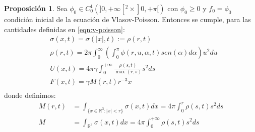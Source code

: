 \documentclass[a4paper,10pt]{scrartcl}
\theoremstyle{definition}
\newtheorem{fact}{Proposición}
\numberwithin{equation}{section}
\begin{document}
\begin{fact}
Sea $\phi_0 \in C_0^1(]0,+\infty[^2 \times ]0,+\pi[)$ con $\phi_0 \ge 0$ y $f_0 = \phi_0$ condición inicial de la ecuación de Vlasov-Poisson. Entonces se cumple, para las cantidades definidas en \eqref{eqn:v-poisson}:
\begin{align*}
 & \sigma(x,t) = \sigma(|x|,t) := \rho(r,t)\\
 & \rho(r, t) = 2\pi \int_0^{\infty} \left(\int_0^\pi \phi(r, u, \alpha, t) sen(\alpha) d\alpha \right)u^2 du\\
 & U(x,t) = 4\pi\gamma \int_0^{+\infty} \frac{\rho(s,t)}{\max(r,s)} s^2 ds\\
 & F(x,t) = \gamma M(r,t) r^{-3} x\\
\end{align*}
donde definimos:
\begin{align*}
 M(r,t) &= \int_{\{x\in \mathbb{R}^3: |x|<r\}} \sigma(x,t) dx = 4\pi \int_0^r\rho(s,t) s^2 ds\\
 M &= \int_{\mathbb{R}^3} \sigma(x,t) dx = 4\pi \int_0^{+\infty}\rho(s,t) s^2 ds\\
\end{align*}
\end{fact}
\end{document}
